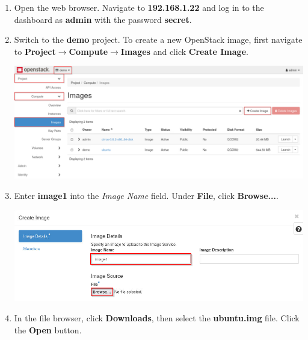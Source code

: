 \documentclass[letterpaper, 12pt]{article}
\begin{document}
\begin{enumerate}
    \item Open the web browser. Navigate to \textbf{192.168.1.22} and log in to the dashboard as
    \textbf{admin} with the password \textbf{secret}.

    \item Switch to the \textbf{demo} project. To create a new OpenStack image, first navigate to
    \textbf{Project$\rightarrow$Compute$\rightarrow$Images} and click \textbf{Create Image}.

    \begin{center}
        \includegraphics[width=\linewidth]{images/part1/step2.png}
    \end{center}

    \item Enter \textbf{image1} into the \textit{Image Name} field. Under \textbf{File}, click \textbf{Browse...}.
    
    \begin{center}
        \includegraphics[width=\linewidth]{images/part1/step3.png}
    \end{center}

    \item In the file browser, click \textbf{Downloads}, then select the \textbf{ubuntu.img} file. Click the
    \textbf{Open} button.


\end{enumerate}
\end{document}
